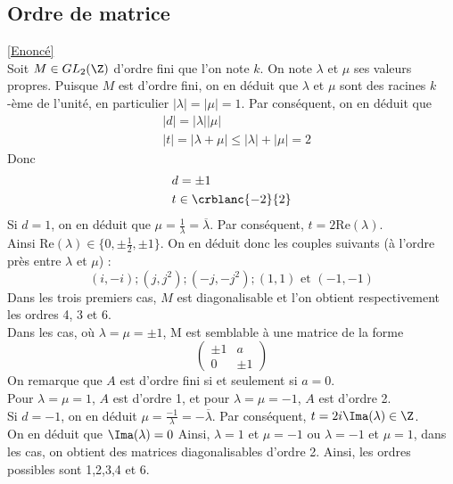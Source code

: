 \documentclass[8pt]{book}
\begin{document}
	\subsection{Ordre de matrice}
	\label{Ordre de matrice corrigé}
	\textcolor{blue}{\hyperref[Ordre de matrice]{[Enoncé]}}\\
	Soit $M\in GL_2(\Z)$ d'ordre fini que l'on note $k$. On note $\lambda$ et $\mu$ ses valeurs propres. Puisque $M$ est d'ordre fini, on en déduit que $\lambda$ et $\mu$ sont des racines $k$-ème de l'unité, en particulier $|\lambda|=|\mu|=1$.
	Par conséquent, on en déduit que 
	\begin{align*}
		&|d|=|\lambda||\mu|\\
		&|t|=|\lambda +\mu|\leq |\lambda|+|\mu|=2
	\end{align*}
	Donc \begin{align*}
	&d=\pm 1\\
	&t\in\crblanc{-2}{2}
	\end{align*}
	Si $d=1$, on en déduit que $\mu=\frac{1}{\lambda}=\overline{\lambda}$. Par conséquent, $t=2\text{Re}(\lambda)$. \\Ainsi $\text{Re}(\lambda)\in\{0 , \pm \frac{1}{2},\pm 1 \}$.
	On en déduit donc les couples suivants (à l'ordre près entre $\lambda$ et $\mu$) :\[(i,-i); (j,j^2); (-j, -j^2); (1,1) \text{ et } (-1,-1)\]
	Dans les trois premiers cas, $M$ est diagonalisable et l'on obtient respectivement les ordres 4, 3 et 6.\\
	Dans les cas, où $\lambda=\mu=\pm 1$, M est semblable à une matrice de la forme \[\begin{pmatrix}
		\pm1 & a\\
		0&\pm1
	\end{pmatrix}\]
	On remarque que $A$ est d'ordre fini si et seulement si $a=0$.\\
	Pour $\lambda=\mu=1$, $A$ est d'ordre 1, et pour $\lambda=\mu=-1$, $A$ est d'ordre 2.\\
	Si $d=-1$, on en déduit $\mu=\frac{-1}{\lambda}=-\overline{\lambda}$. Par conséquent, $t=2i\Ima(\lambda)\in \Z$.\\
	On en déduit que $\Ima(\lambda)=0$
	Ainsi, $\lambda=1$ et $\mu=-1$ ou $\lambda=-1$ et $\mu=1$, dans les cas, on obtient des matrices diagonalisables d'ordre 2.
	Ainsi, les ordres possibles sont 1,2,3,4 et 6.
\end{document}
